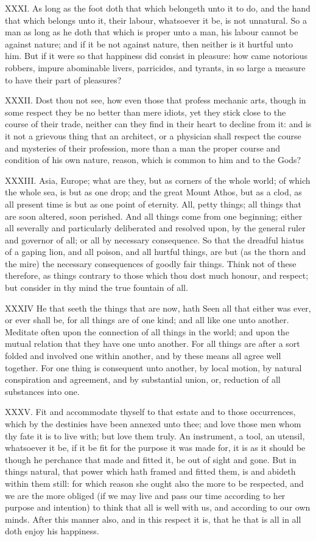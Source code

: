 XXXI. As long as the foot doth that which belongeth unto it to do, and
the hand that which belongs unto it, their labour, whatsoever it be, is
not unnatural. So a man as long as he doth that which is proper unto a
man, his labour cannot be against nature; and if it be not against nature,
then neither is it hurtful unto him. But if it were so that happiness did
consist in pleasure: how came notorious robbers, impure abominable livers,
parricides, and tyrants, in so large a measure to have their part of
pleasures?

XXXII. Dost thou not see, how even those that profess mechanic arts,
though in some respect they be no better than mere idiots, yet they stick
close to the course of their trade, neither can they find in their heart
to decline from it: and is it not a grievous thing that an architect, or a
physician shall respect the course and mysteries of their profession, more
than a man the proper course and condition of his own nature, reason,
which is common to him and to the Gods?

XXXIII. Asia, Europe; what are they, but as corners of the whole world;
of which the whole sea, is but as one drop; and the great Mount Athos, but
as a clod, as all present time is but as one point of eternity. All, petty
things; all things that are soon altered, soon perished. And all things
come from one beginning; either all severally and particularly deliberated
and resolved upon, by the general ruler and governor of all; or all by
necessary consequence. So that the dreadful hiatus of a gaping lion, and
all poison, and all hurtful things, are but (as the thorn and the mire)
the necessary consequences of goodly fair things. Think not of these
therefore, as things contrary to those which thou dost much honour, and
respect; but consider in thy mind the true fountain of all.

XXXIV He that seeth the things that are now, hath Seen all that either
was ever, or ever shall be, for all things are of one kind; and all like
one unto another. Meditate often upon the connection of all things in the
world; and upon the mutual relation that they have one unto another. For
all things are after a sort folded and involved one within another, and by
these means all agree well together. For one thing is consequent unto
another, by local motion, by natural conspiration and agreement, and by
substantial union, or, reduction of all substances into one.

XXXV. Fit and accommodate thyself to that estate and to those
occurrences, which by the destinies have been annexed unto thee; and love
those men whom thy fate it is to live with; but love them truly. An
instrument, a tool, an utensil, whatsoever it be, if it be fit for the
purpose it was made for, it is as it should be though he perchance that
made and fitted it, be out of sight and gone. But in things natural, that
power which hath framed and fitted them, is and abideth within them still:
for which reason she ought also the more to be respected, and we are the
more obliged (if we may live and pass our time according to her purpose
and intention) to think that all is well with us, and according to our own
minds. After this manner also, and in this respect it is, that he that is
all in all doth enjoy his happiness.

